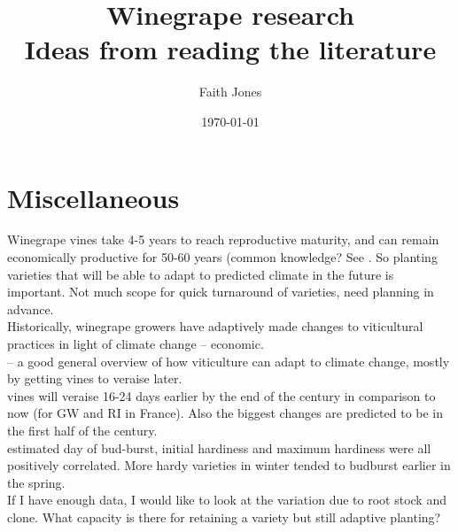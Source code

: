 \documentclass[11pt,letter]{article}
\title{Winegrape research \\ Ideas from reading the literature }
\date{\today}
\author{Faith Jones}
\begin{document}
\renewcommand{\bibname}{References}%


\maketitle
\tableofcontents

\section{Miscellaneous}

Winegrape vines take 4-5 years to reach reproductive maturity, and can remain economically  productive for 50-60 years (common knowledge? See \cite{Bindi1996}. So planting varieties that will be able to adapt to predicted climate in the future is important. Not much scope for quick turnaround of varieties, need planning in advance.\\

Historically, winegrape growers have adaptively made changes to viticultural practices in light of climate change \citep{Ashenfelter2016}– economic. \\

\cite{VanLeeuwen2017} – a good general overview of how viticulture can adapt to climate change, mostly by getting vines to veraise later. \\

vines will veraise 16-24 days earlier by the end of the century in comparison to now \citep{Duchene2010} (for GW and RI in France). Also the biggest changes are predicted to be in the first half of the century. \\

\cite{Ferguson2014} estimated day of bud-burst, initial hardiness and maximum hardiness were all positively correlated. More hardy varieties in winter tended to budburst earlier in the spring. \\

If I have enough data, I would like to look at the variation due to root stock and clone. What capacity is there for retaining a variety but still adaptive planting?\\
\end{document}
